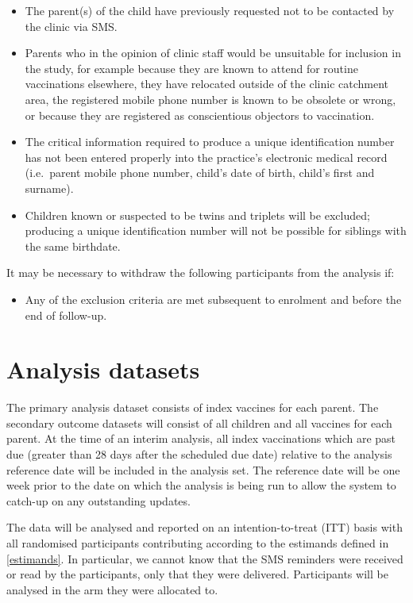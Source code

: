 \documentclass[
  bibliography=totoc]{scrreprt}
\providecommand{\tightlist}{%
  \setlength{\itemsep}{0pt}\setlength{\parskip}{0pt}}
\begin{document}
\begin{itemize}
\tightlist
\item
  The parent(s) of the child have previously requested not to be contacted by the clinic via SMS.
\item
  Parents who in the opinion of clinic staff would be unsuitable for inclusion in the study, for example because they are known to attend for routine vaccinations elsewhere, they have relocated outside of the clinic catchment area, the registered mobile phone number is known to be obsolete or wrong, or because they are registered as conscientious objectors to vaccination.
\item
  The critical information required to produce a unique identification number has not been entered properly into the practice's electronic medical record (i.e.~parent mobile phone number, child's date of birth, child's first and surname).
\item
  Children known or suspected to be twins and triplets will be excluded; producing a unique identification number will not be possible for siblings with the same birthdate.
\end{itemize}

It may be necessary to withdraw the following participants from the analysis if:

\begin{itemize}
\tightlist
\item
  Any of the exclusion criteria are met subsequent to enrolment and before the end of follow-up.
\end{itemize}

\hypertarget{analysis-datasets}{%
\section{Analysis datasets}\label{analysis-datasets}}

The primary analysis dataset consists of index vaccines for each parent.
The secondary outcome datasets will consist of all children and all vaccines for each parent.
At the time of an interim analysis, all index vaccinations which are past due (greater than 28 days after the scheduled due date) relative to the analysis reference date will be included in the analysis set.
The reference date will be one week prior to the date on which the analysis is being run to allow the system to catch-up on any outstanding updates.

The data will be analysed and reported on an intention-to-treat (ITT) basis with all randomised participants contributing according to the estimands defined in \ref{estimands}.
In particular, we cannot know that the SMS reminders were received or read by the participants, only that they were delivered.
Participants will be analysed in the arm they were allocated to.
\end{document}
